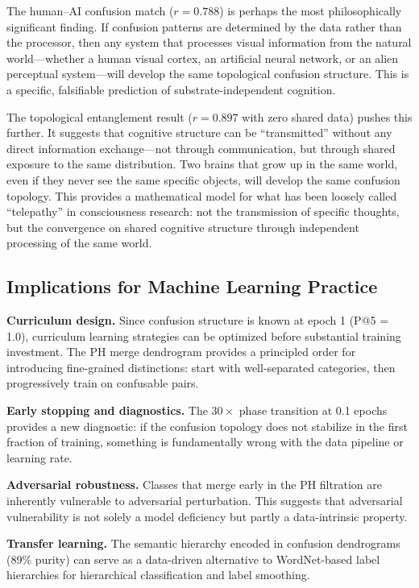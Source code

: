 \documentclass[11pt,a4paper]{article}
\begin{document}
The human--AI confusion match ($r = 0.788$) is perhaps the most philosophically significant finding. If confusion patterns are determined by the data rather than the processor, then any system that processes visual information from the natural world---whether a human visual cortex, an artificial neural network, or an alien perceptual system---will develop the same topological confusion structure. This is a specific, falsifiable prediction of substrate-independent cognition.

The topological entanglement result ($r = 0.897$ with zero shared data) pushes this further. It suggests that cognitive structure can be ``transmitted'' without any direct information exchange---not through communication, but through shared exposure to the same distribution. Two brains that grow up in the same world, even if they never see the same specific objects, will develop the same confusion topology. This provides a mathematical model for what has been loosely called ``telepathy'' in consciousness research: not the transmission of specific thoughts, but the convergence on shared cognitive structure through independent processing of the same world.

\subsection{Implications for Machine Learning Practice}

\textbf{Curriculum design.} Since confusion structure is known at epoch 1 (P@5 = 1.0), curriculum learning strategies can be optimized before substantial training investment. The PH merge dendrogram provides a principled order for introducing fine-grained distinctions: start with well-separated categories, then progressively train on confusable pairs.

\textbf{Early stopping and diagnostics.} The $30\times$ phase transition at 0.1 epochs provides a new diagnostic: if the confusion topology does not stabilize in the first fraction of training, something is fundamentally wrong with the data pipeline or learning rate.

\textbf{Adversarial robustness.} Classes that merge early in the PH filtration are inherently vulnerable to adversarial perturbation. This suggests that adversarial vulnerability is not solely a model deficiency but partly a data-intrinsic property.

\textbf{Transfer learning.} The semantic hierarchy encoded in confusion dendrograms (89\% purity) can serve as a data-driven alternative to WordNet-based label hierarchies for hierarchical classification and label smoothing.
\end{document}
